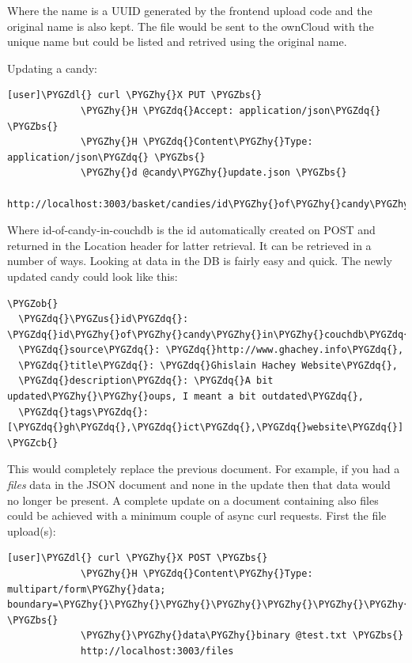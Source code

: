 \documentclass[letterpaper,10pt,english]{sphinxmanual}
\def\PYGZbs{\char`\\}
\def\PYGZus{\char`\_}
\def\PYGZob{\char`\{}
\def\PYGZcb{\char`\}}
\def\PYGZdl{\char`\$}
\def\PYGZhy{\char`\-}
\def\PYGZdq{\char`\"}
\begin{document}
Where the name is a UUID generated by the frontend upload code and the
original name is also kept. The file would be sent to the ownCloud
with the unique name but could be listed and retrived using the
original name.

Updating a candy:

\begin{Verbatim}[commandchars=\\\{\}]
[user]\PYGZdl{} curl \PYGZhy{}X PUT \PYGZbs{}
             \PYGZhy{}H \PYGZdq{}Accept: application/json\PYGZdq{}  \PYGZbs{}
             \PYGZhy{}H \PYGZdq{}Content\PYGZhy{}Type: application/json\PYGZdq{} \PYGZbs{}
             \PYGZhy{}d @candy\PYGZhy{}update.json \PYGZbs{}
             http://localhost:3003/basket/candies/id\PYGZhy{}of\PYGZhy{}candy\PYGZhy{}in\PYGZhy{}couchdb
\end{Verbatim}

Where id-of-candy-in-couchdb is the id automatically created on POST
and returned in the Location header for latter retrieval. It can be
retrieved in a number of ways. Looking at data in the DB is fairly
easy and quick. The newly updated candy could look like this:

\begin{Verbatim}[commandchars=\\\{\}]
\PYGZob{}
  \PYGZdq{}\PYGZus{}id\PYGZdq{}: \PYGZdq{}id\PYGZhy{}of\PYGZhy{}candy\PYGZhy{}in\PYGZhy{}couchdb\PYGZdq{}
  \PYGZdq{}source\PYGZdq{}: \PYGZdq{}http://www.ghachey.info\PYGZdq{},
  \PYGZdq{}title\PYGZdq{}: \PYGZdq{}Ghislain Hachey Website\PYGZdq{},
  \PYGZdq{}description\PYGZdq{}: \PYGZdq{}A bit updated\PYGZhy{}\PYGZhy{}oups, I meant a bit outdated\PYGZdq{},
  \PYGZdq{}tags\PYGZdq{}: [\PYGZdq{}gh\PYGZdq{},\PYGZdq{}ict\PYGZdq{},\PYGZdq{}website\PYGZdq{}]
\PYGZcb{}
\end{Verbatim}

This would completely replace the previous document. For example, if
you had a \emph{files} data in the JSON document and none in the update
then that data would no longer be present. A complete update on a
document containing also files could be achieved with a minimum couple
of async curl requests. First the file upload(s):

\begin{Verbatim}[commandchars=\\\{\}]
[user]\PYGZdl{} curl \PYGZhy{}X POST \PYGZbs{}
             \PYGZhy{}H \PYGZdq{}Content\PYGZhy{}Type: multipart/form\PYGZhy{}data; boundary=\PYGZhy{}\PYGZhy{}\PYGZhy{}\PYGZhy{}\PYGZhy{}\PYGZhy{}\PYGZhy{}\PYGZhy{}\PYGZhy{}\PYGZhy{}\PYGZhy{}\PYGZhy{}\PYGZhy{}\PYGZhy{}\PYGZhy{}\PYGZhy{}\PYGZhy{}\PYGZhy{}\PYGZhy{}\PYGZhy{}\PYGZhy{}\PYGZhy{}\PYGZhy{}\PYGZhy{}\PYGZhy{}\PYGZhy{}\PYGZhy{}11936647625814307171179269292\PYGZdq{} \PYGZbs{}
             \PYGZhy{}\PYGZhy{}data\PYGZhy{}binary @test.txt \PYGZbs{}
             http://localhost:3003/files
\end{Verbatim}
\end{document}

